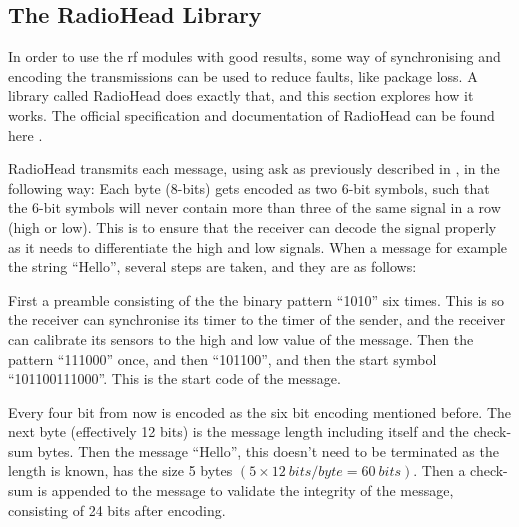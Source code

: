 \subsection{The RadioHead Library}\label{subsubsec:RadioHead}

In order to use the \gls{rf} modules with good results, some way of synchronising and encoding the transmissions can be used to reduce faults, like package loss.
A library called RadioHead does exactly that, and this section explores how it works.
The official specification and documentation of RadioHead can be found here \cite{2015ArduinoRadioHead}.

RadioHead transmits each message, using \gls{ask} as previously described in , in the following way:
Each byte (8-bits) gets encoded as two 6-bit symbols, such that the 6-bit symbols will never contain more than three of the same signal in a row (high or low).
This is to ensure that the receiver can decode the signal properly as it needs to differentiate the high and low signals.
When a message for example the string \enquote{Hello}, several steps are taken, and they are as follows:

First a preamble consisting of the the binary pattern \enquote{1010} six times. 
This is so the receiver can synchronise its timer to the timer of the sender, and the receiver can calibrate its sensors to the high and low value of the message.
Then the pattern \enquote{111000} once, and then \enquote{101100}, and then the start symbol \enquote{101100111000}. 
This is the start code of the message. 

Every four bit from now is encoded as the six bit encoding mentioned before.
The next byte (effectively 12 bits) is the message length including itself and the check-sum bytes.
Then the message \enquote{Hello}, this doesn't need to be terminated as the length is known, has the size 5 bytes $(5 \times 12\ bits/byte = 60\ bits)$.
Then a check-sum is appended to the message to validate the integrity of the message, consisting of 24 bits after encoding.

